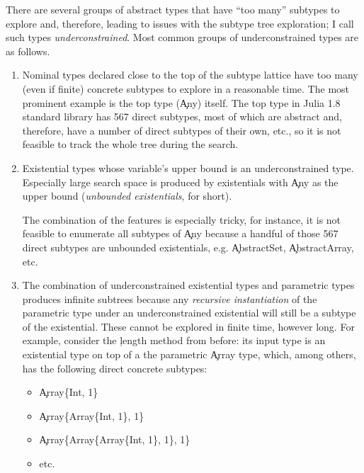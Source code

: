 There are several groups of abstract types that have ``too many'' subtypes to explore
and, therefore, leading to issues with the subtype tree exploration; I call such
types \emph{underconstrained}. Most common groups of underconstrained types are
as follows.
\begin{enumerate}

  \item Nominal types declared close to the top of the subtype lattice
    have too many (even if finite) concrete subtypes to explore in a reasonable time.
    The most prominent example is the top type (\c{Any}) itself.
    The top type in Julia 1.8 standard library has 567 direct subtypes, most of
    which are abstract and, therefore, have a number of direct subtypes of
    their own, etc., so it is not feasible to track the whole tree during the search.

  \item Existential types whose variable's upper bound is an underconstrained
    type. Especially large search space is produced by existentials with \c{Any}
    as the upper bound (\emph{unbounded existentials}, for short).

    The combination of the features is especially tricky, for instance, it is
    not feasible to enumerate all subtypes of \c{Any} because a handful of those
    567 direct subtypes are unbounded existentials, e.g. \c{AbstractSet},
    \c{AbstractArray}, etc.

  \item The combination of underconstrained existential types and parametric
    types produces infinite subtrees because any \emph{recursive instantiation}
    of the parametric type under an underconstrained existential will still be a
    subtype of the existential. These cannot be explored in finite time, however
    long. For example, consider the \c{length} method from before: its input
    type is an existential type on top of a the parametric \c{Array} type,
    which, among others, has the following direct concrete subtypes:
    \begin{itemize}
      \item \c{Array\{Int, 1\}}
      \item \c{Array\{Array\{Int, 1\}, 1\}}
      \item \c{Array\{Array\{Array\{Int, 1\}, 1\}, 1\}}
      \item etc.
    \end{itemize}

\end{enumerate}

